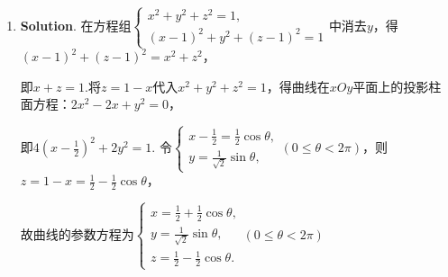 \documentclass[../Main.tex]{subfiles}
\begin{document}
\begin{enumerate}
          所以直线$L$在平面$\pi$上的投影直线的方程为$\begin{cases}
                  4x+5y-2z+12=0, \\
                  x-4y-8z+12=0.
              \end{cases}$

    \item \textbf{Solution}. 在方程组$\begin{cases}
                  x^{2}+y^{2}+z^{2}=1, \\
                  (x-1)^{2}+y^{2}+(z-1)^{2}=1
              \end{cases}$中消去$y$，得$(x-1)^{2}+(z-1)^{2}=x^{2}+z^{2}$，

          即$x+z=1$.将$z=1-x$代入$x^{2}+y^{2}+z^{2}=1$，得曲线在$xOy$平面上的投影柱面方程：$2
              x^{2}-2x+y^{2}=0$，

          即$4\left(x-\frac{1}{2}\right)^{2}+2y^{2}=1$. 令$\begin{cases}
                  x-\frac{1}{2} = \frac{1}{2}\cos \theta, \\[4.5pt]
                  y = \frac{1}{\sqrt{2}}\sin \theta,
              \end{cases}(0\leq \theta < 2\pi)$，则$z=1-x=\frac{1}{2}-\frac{1}{2}\cos\theta$，

          故曲线的参数方程为$\begin{cases}
                  x = \frac{1}{2}+\frac{1}{2}\cos \theta, \\[4.5pt]
                  y = \frac{1}{\sqrt{2}}\sin \theta,      \\[6pt]
                  z = \frac{1}{2}-\frac{1}{2}\cos \theta.
              \end{cases}(0\leq \theta < 2\pi)$


\end{enumerate}
\end{document}
